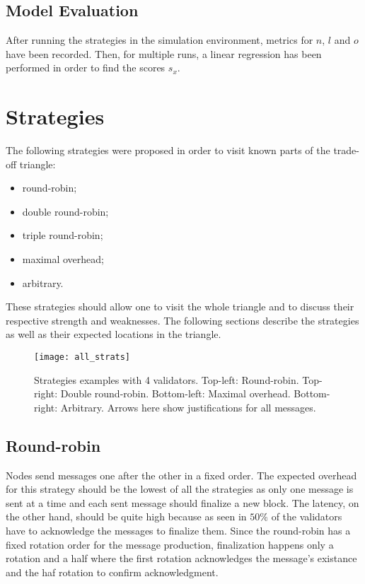 \subsection{Model Evaluation}
After running the strategies in the simulation environment, metrics for \(n\),
\(l\) and \(o\) have been recorded. Then, for multiple runs, a linear regression
has been performed in order to find the scores \(s_x\).

\section{Strategies}
\label{sec:strategies}

The following strategies were proposed in order to visit known parts of the
trade-off triangle:
\begin{itemize}
        \item round-robin;
        \item double round-robin;
        \item triple round-robin;
        \item maximal overhead;
        \item arbitrary.
\end{itemize}
These strategies should allow one to visit the whole triangle and to discuss
their respective strength and weaknesses. The following sections describe the
strategies as well as their expected locations in the triangle.

\begin{figure}[h]
	\centering
	\texttt{[image: all\_strats]}
    \caption{Strategies examples with 4 validators. Top-left: Round-robin.
    Top-right: Double round-robin. Bottom-left: Maximal overhead. Bottom-right:
    Arbitrary. Arrows here show justifications for all messages.}
	\label{fig:allStrats}
\end{figure}

\subsection{Round-robin}
Nodes send messages one after the other in a fixed order. The expected overhead
for this strategy should be the lowest of all the strategies as only one
message is sent at a time and each sent message should finalize a new block.
The latency, on the other hand, should be quite high because as seen in
 \(50\%\) of the validators have to acknowledge the messages to
finalize them. Since the round-robin has a fixed rotation order for the
message production, finalization happens only a rotation and a half where the
first rotation acknowledges the message's existance and the haf rotation to
confirm acknowledgment.


